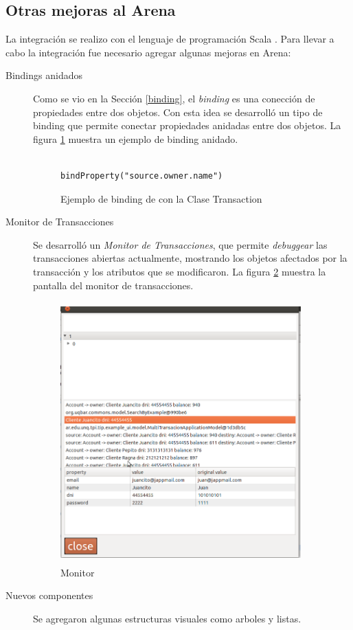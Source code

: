 \subsection{Otras mejoras al Arena}
	La integración se realizo con el lenguaje de programación Scala
	\cite{OderskySpoonVenners08}. Para llevar a cabo la integración fue necesario agregar algunas
	mejoras en Arena:
	\begin{description}

	  \item[Bindings anidados] Como se vio en la Sección \ref{binding},
		  el \emph{binding} es una conección de propiedades entre dos objetos. Con
		  esta idea se desarrolló un tipo de binding que permite conectar propiedades
		  anidadas entre dos objetos. La figura \ref{bindAnidado} muestra un ejemplo de binding anidado.

			\begin{figure}[h]
			\centering
					\begin{lstlisting}
						bindProperty("source.owner.name") 
					\end{lstlisting}
			\caption{Ejemplo de binding de con la Clase Transaction}
			\label{bindAnidado}
		\end{figure}	

	  \item[Monitor de Transacciones]
		 Se desarrolló un \emph{Monitor de Transacciones}, que permite
		 \emph{debuggear} las transacciones abiertas actualmente, mostrando
		 los objetos afectados por la transacción y los atributos que se
		 modificaron.
		La figura \ref{monitor} muestra la pantalla del monitor de transacciones.
		
		\begin{figure}[h]
			\centering
			\includegraphics[width=350px, height=380px]{img/monitorTransacciones.png}
			\caption{Monitor}
			\label{monitor}
		\end{figure}	
	
	  \item[Nuevos componentes] Se agregaron algunas estructuras visuales como
	  arboles y listas.
	\end{description}
